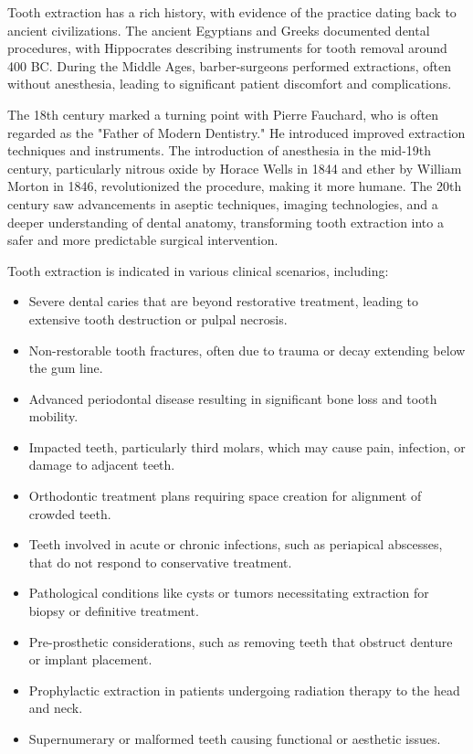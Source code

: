 Tooth extraction has a rich history, with evidence of the practice dating back to ancient civilizations. The ancient Egyptians and Greeks documented dental procedures, with Hippocrates describing instruments for tooth removal around 400 BC. During the Middle Ages, barber-surgeons performed extractions, often without anesthesia, leading to significant patient discomfort and complications.

The 18th century marked a turning point with Pierre Fauchard, who is often regarded as the "Father of Modern Dentistry." He introduced improved extraction techniques and instruments. The introduction of anesthesia in the mid-19th century, particularly nitrous oxide by Horace Wells in 1844 and ether by William Morton in 1846, revolutionized the procedure, making it more humane. The 20th century saw advancements in aseptic techniques, imaging technologies, and a deeper understanding of dental anatomy, transforming tooth extraction into a safer and more predictable surgical intervention.

Tooth extraction is indicated in various clinical scenarios, including:

\begin{itemize}
  \item Severe dental caries that are beyond restorative treatment, leading to extensive tooth destruction or pulpal necrosis.
  \item Non-restorable tooth fractures, often due to trauma or decay extending below the gum line.
  \item Advanced periodontal disease resulting in significant bone loss and tooth mobility.
  \item Impacted teeth, particularly third molars, which may cause pain, infection, or damage to adjacent teeth.
  \item Orthodontic treatment plans requiring space creation for alignment of crowded teeth.
  \item Teeth involved in acute or chronic infections, such as periapical abscesses, that do not respond to conservative treatment.
  \item Pathological conditions like cysts or tumors necessitating extraction for biopsy or definitive treatment.
  \item Pre-prosthetic considerations, such as removing teeth that obstruct denture or implant placement.
  \item Prophylactic extraction in patients undergoing radiation therapy to the head and neck.
  \item Supernumerary or malformed teeth causing functional or aesthetic issues.
\end{itemize}

